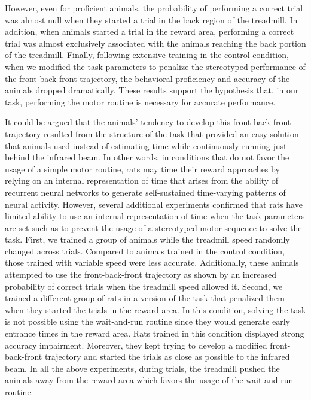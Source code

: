 However, even for proficient animals, the probability of performing a correct trial was almost null when they started a trial in the back region of the treadmill.
In addition, when animals started a trial in the reward area, performing a correct trial was almost exclusively associated with the animals reaching the back portion of the treadmill.
Finally, following extensive training in the control condition, when we modified the task parameters to penalize the stereotyped performance of the front-back-front trajectory, the behavioral proficiency and accuracy of the animals dropped dramatically.
These results support the hypothesis that, in our task, performing the motor routine is necessary for accurate performance.
\par
It could be argued that the animals' tendency to develop this front-back-front trajectory resulted from the structure of the task that provided an easy solution that animals used instead of estimating time while continuously running just behind the infrared beam.
In other words, in conditions that do not favor the usage of a simple motor routine, rats may time their reward approaches by relying on an internal representation of time that arises from the ability of recurrent neural networks to generate self-sustained time-varying patterns of neural activity\cite{BuonomanoTICS2010}.
However, several additional experiments confirmed that rats have limited ability to use an internal representation of time when the task parameters are set such as to prevent the usage of a stereotyped motor sequence to solve the task.
First, we trained a group of animals while the treadmill speed randomly changed across trials.
Compared to animals trained in the control condition, those trained with variable speed were less accurate.
Additionally, these animals attempted to use the front-back-front trajectory as shown by an increased probability of correct trials when the treadmill speed allowed it.
Second, we trained a different group of rats in a version of the task that penalized them when they started the trials in the reward area.
In this condition, solving the task is not possible using the wait-and-run routine since they would generate early entrance times in the reward area.
Rats trained in this condition displayed strong accuracy impairment.
Moreover, they kept trying to develop a modified front-back-front trajectory and started the trials as close as possible to the infrared beam.
In all the above experiments, during trials, the treadmill pushed the animals away from the reward area which favors the usage of the wait-and-run routine.
